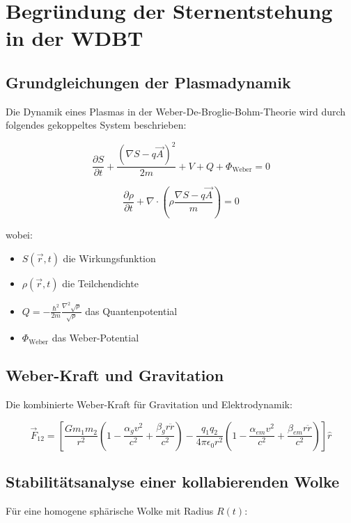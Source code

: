 \chapter{Begründung der Sternentstehung in der WDBT}
\label{app:sternentstehung}

\section{Grundgleichungen der Plasmadynamik}
Die Dynamik eines Plasmas in der Weber-De-Broglie-Bohm-Theorie wird durch folgendes gekoppeltes System beschrieben:

\begin{equation}
\frac{\partial S}{\partial t} + \frac{(\nabla S - q\vec{A})^2}{2m} + V + Q + \Phi_{\text{Weber}} = 0
\end{equation}

\begin{equation}
\frac{\partial \rho}{\partial t} + \nabla \cdot \left(\rho \frac{\nabla S - q\vec{A}}{m}\right) = 0
\end{equation}

wobei:
\begin{itemize}
\item $S(\vec{r},t)$ die Wirkungsfunktion
\item $\rho(\vec{r},t)$ die Teilchendichte
\item $Q = -\frac{\hbar^2}{2m}\frac{\nabla^2 \sqrt{\rho}}{\sqrt{\rho}}$ das Quantenpotential
\item $\Phi_{\text{Weber}}$ das Weber-Potential
\end{itemize}

\section{Weber-Kraft und Gravitation}
Die kombinierte Weber-Kraft für Gravitation und Elektrodynamik:

\begin{equation}
    \label{eq:weber_em_und_g}
    \vec{F}_{12} = \left[ \frac{G m_1 m_2}{r^2} \left( 1 - \frac{\alpha_g v^2}{c^2} + \frac{\beta_g r \ddot{r}}{c^2} \right) - \frac{q_1 q_2}{4\pi\epsilon_0 r^2} \left( 1 - \frac{\alpha_{em} v^2}{c^2} + \frac{\beta_{em} r \ddot{r}}{c^2} \right) \right] \hat{r}
\end{equation}

\section{Stabilitätsanalyse einer kollabierenden Wolke}
Für eine homogene sphärische Wolke mit Radius $R(t)$:

